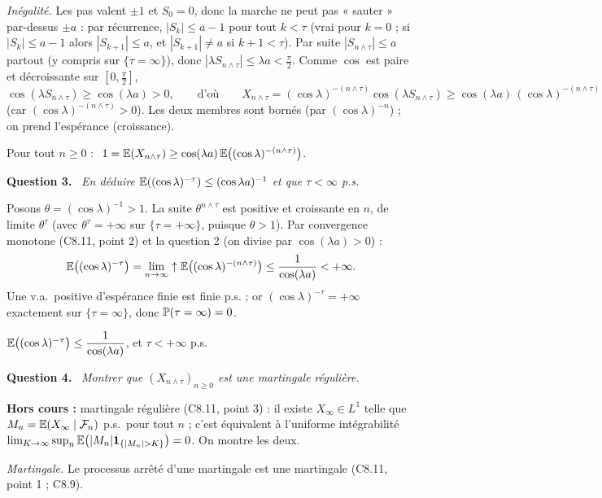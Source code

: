 \documentclass[11pt,a4paper]{article}
\newcommand{\question}[1]{\par\medskip\noindent\textbf{Question #1.}~}
\begin{document}
\begin{exo}[{Martingale trigonométrique et sortie de $]
\emph{Inégalité.} Les pas valent $\pm1$ et $S_0=0$, donc la marche ne peut pas « sauter » par-dessus $\pm a$ : par récurrence,
$|S_k|\le a-1$ pour tout $k<\tau$ (vrai pour $k=0$ ; si $|S_k|\le a-1$ alors $|S_{k+1}|\le a$, et $|S_{k+1}|\neq a$ si $k+1<\tau$).
Par suite $|S_{n\wedge\tau}|\le a$ partout (y compris sur $\{\tau=\infty\}$), donc $|\lambda S_{n\wedge\tau}|\le\lambda a<\frac\pi2$.
Comme $\cos$ est paire et décroissante sur $[0,\frac\pi2]$,
\[\cos(\lambda S_{n\wedge\tau})\ge\cos(\lambda a)>0,\qquad\text{d'où}\qquad X_{n\wedge\tau}=(\cos\lambda)^{-(n\wedge\tau)}\cos(\lambda S_{n\wedge\tau})
\ge\cos(\lambda a)\,(\cos\lambda)^{-(n\wedge\tau)}\]
(car $(\cos\lambda)^{-(n\wedge\tau)}>0$). Les deux membres sont bornés (par $(\cos\lambda)^{-n}$) ; on prend l'espérance (croissance).
\begin{resultat}
Pour tout $n\ge0$ : $\ 1=\E(X_{n\wedge\tau})\ge\cos(\lambda a)\,\E\bigl((\cos\lambda)^{-(n\wedge\tau)}\bigr)$.
\end{resultat}

\question{3} \emph{En déduire $\mathbb{E}((\cos\lambda)^{-\tau})\le(\cos\lambda a)^{-1}$ et que $\tau<\infty$ p.s.}

Posons $\theta=(\cos\lambda)^{-1}>1$. La suite $\theta^{n\wedge\tau}$ est positive et croissante en $n$, de limite $\theta^\tau$
(avec $\theta^\tau=+\infty$ sur $\{\tau=+\infty\}$, puisque $\theta>1$). Par convergence monotone (C8.11, point 2) et la question 2
(on divise par $\cos(\lambda a)>0$) :
\[\mathbb{E}\bigl((\cos\lambda)^{-\tau}\bigr)=\lim_{n\to\infty}\uparrow\mathbb{E}\bigl((\cos\lambda)^{-(n\wedge\tau)}\bigr)\le\frac1{\cos(\lambda a)}<+\infty.\]
Une v.a.\ positive d'espérance finie est finie p.s. ; or $(\cos\lambda)^{-\tau}=+\infty$ exactement sur $\{\tau=\infty\}$, donc
$\mathbb{P}(\tau=\infty)=0$.
\begin{resultat}
$\mathbb{E}\bigl((\cos\lambda)^{-\tau}\bigr)\le\dfrac1{\cos(\lambda a)}$, et $\tau<+\infty$ p.s.
\end{resultat}

\question{4} \emph{Montrer que $(X_{n\wedge\tau})_{n\ge0}$ est une martingale régulière.}

\textbf{Hors cours :} martingale régulière (C8.11, point 3) : il existe $X_\infty\in L^1$ telle que $M_n=\mathbb{E}(X_\infty\mid\mathcal{F}_n)$ p.s.\
pour tout $n$ ; c'est équivalent à l'uniforme intégrabilité $\lim_{K\to\infty}\sup_n\E\bigl(|M_n|\1_{\{|M_n|>K\}}\bigr)=0$. On montre les deux.

\emph{Martingale.} Le processus arrêté d'une martingale est une martingale (C8.11, point 1 ; C8.9).


\end{exo}
\end{document}

